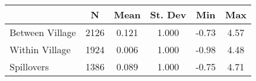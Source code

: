 \begin{tabular}{l*{5}{c}}\hline&\multicolumn{1}{c}{N}&\multicolumn{1}{c}{Mean}&\multicolumn{1}{c}{St. Dev}&\multicolumn{1}{c}{Min}&\multicolumn{1}{c}{Max}\\ \hline 
Between Village & 2126 & 0.121 & 1.000 & -0.73 & 4.57 \\
Within Village & 1924 & 0.006 & 1.000 & -0.98 & 4.48 \\
Spillovers & 1386 & 0.089 & 1.000 & -0.75 & 4.71 \\
\hline \end{tabular}
